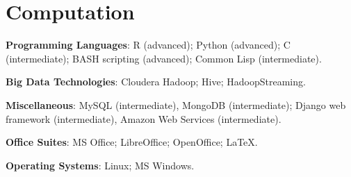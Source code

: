 \documentclass[a4paper,11pt]{article}
\renewenvironment{itemize}{
\begin{list}{}{
  \setlength{\leftmargin}{1.5em}
  }
  }{
\end{list}
}
\begin{document}
\section*{Computation}
\begin{itemize}
  \item \textbf{Programming Languages}: R (advanced); Python (advanced); C
    (intermediate); BASH scripting (advanced); Common Lisp (intermediate).
  \item \textbf{Big Data Technologies}: Cloudera Hadoop; Hive; HadoopStreaming.
  \item \textbf{Miscellaneous}: MySQL (intermediate), MongoDB (intermediate);
    Django web framework (intermediate), Amazon Web Services (intermediate).
  \item \textbf{Office Suites}: MS Office; LibreOffice; OpenOffice; \LaTeX{}.
  \item \textbf{Operating Systems}: Linux; MS Windows.
\end{itemize}
\end{document}
